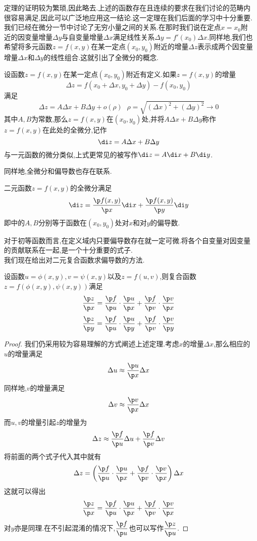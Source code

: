 \documentclass{ctexart}
\begin{document}
定理的证明较为繁琐,因此略去.上述的函数存在且连续的要求在我们讨论的范畴内很容易满足,因此可以广泛地应用这一结论.这一定理在我们后面的学习中十分重要.\vspace{4pt}\\
\indent 我们已经在微分一节中讨论了无穷小量之间的关系.在那时我们说在定点$x=x_0$附近的因变量增量$\Delta y$与自变量增量$\Delta x$满足线性关系$\Delta y=f'\left(x_0\right)\Delta x$.同样地,我们也希望将多元函数$z=f(x,y)$在某一定点$\left(x_0,y_0\right)$附近的增量$\Delta z$表示成两个因变量增量$\Delta x$和$\Delta y$的线性组合.这就引出了全微分的概念.
\begin{definition}[0B.2.4 二元函数的全微分]
    设函数$z=f(x,y)$在某一定点$\left(x_0,y_0\right)$附近有定义.如果$z=f(x,y)$的增量
    \[\Delta z=f\left(x_0+\Delta x,y_0+\Delta y\right)-f\left(x_0,y_0\right)\]
    满足
    \[\Delta z=A\Delta x+B\Delta y+o(\rho)\ \ \ \rho=\sqrt{\left(\Delta x\right)^2+\left(\Delta y\right)^2}\to0\]
    其中$A,B$为常数,那么$z=f(x,y)$在$\left(x_0,y_0\right)$处,并将$A\Delta x+B\Delta y$称作$z=f(x,y)$在此处的全微分,记作
    \[\di z=A\Delta x+B\Delta y\]
    与一元函数的微分类似,上式更常见的被写作$\di z=A\di x+B\di y$.
\end{definition}
同样地,全微分和偏导数也存在联系.
\begin{theorem}[0B.2.5 全微分与偏导数的关系]
    二元函数$z=f(x,y)$的全微分满足
    \[\di z=\dfrac{\p f(x,y)}{\p x}\di x+\dfrac{\p f(x,y)}{\p y}\di y\]
    即中的$A,B$分别等于函数在$\left(x_0,y_0\right)$处对$x$和对$y$的偏导数.
\end{theorem}
对于初等函数而言,在定义域内只要偏导数存在就一定可微.将各个自变量对因变量的贡献联系在一起,是一个十分重要的式子.\vspace{4pt}\\
\indent 我们现在给出对二元复合函数求偏导数的方法.
\begin{theorem}[0B.2.6 复合函数求偏导法]
    设函数$u=\phi(x,y),v=\psi(x,y)$以及$z=f(u,v)$,则复合函数$z=f(\phi(x,y),\psi(x,y))$满足\footnotemark
    \[\dfrac{\p z}{\p x}=\dfrac{\p f}{\p u}\cdot\dfrac{\p u}{\p x}+\dfrac{\p f}{\p v}\cdot\dfrac{\p v}{\p x}\]
    \[\dfrac{\p z}{\p y}=\dfrac{\p f}{\p u}\cdot\dfrac{\p u}{\p y}+\dfrac{\p f}{\p v}\cdot\dfrac{\p v}{\p y}\]

\end{theorem}
\begin{proof}
    我们仍采用较为容易理解的方式阐述上述定理.考虑$x$的增量$\Delta x$,那么相应的$u$的增量满足
    \[\Delta u\approx\dfrac{\p u}{\p x}\Delta x\]
    同样地,$v$的增量满足
    \[\Delta v\approx\dfrac{\p v}{\p x}\Delta x\]
    而$u,v$的增量引起$z$的增量为
    \[\Delta z\approx\dfrac{\p f}{\p u}\Delta u+\dfrac{\p f}{\p v}\Delta v\]
    将前面的两个式子代入其中就有
    \[\Delta z=\left(\dfrac{\p f}{\p u}\cdot\dfrac{\p u}{\p x}+\dfrac{\p f}{\p v}\cdot\dfrac{\p v}{\p x}\right)\Delta x\]
    这就可以得出
    \[\dfrac{\p z}{\p x}=\dfrac{\p f}{\p u}\cdot\dfrac{\p u}{\p x}+\dfrac{\p f}{\p v}\cdot\dfrac{\p v}{\p x}\]
    对$y$亦是同理.在不引起混淆的情况下,$\dfrac{\p f}{\p u}$也可以写作$\dfrac{\p z}{\p u}$.

\end{proof}
\end{document}
